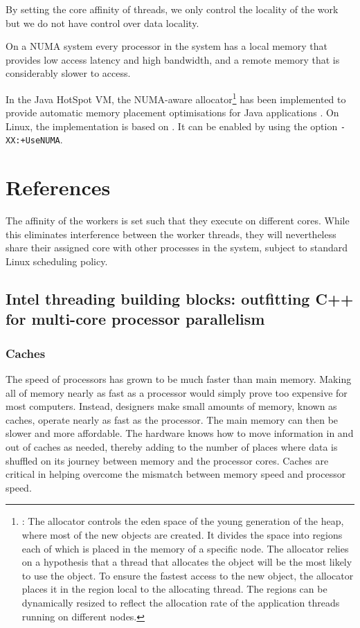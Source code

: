 By setting the core affinity of threads, we only control the locality
of the work but we do not have control over data locality.

On a NUMA system every processor in the system has a local memory that
provides low access latency and high bandwidth, and a remote memory
that is considerably slower to access.

In the Java HotSpot VM, the NUMA-aware
allocator\footnote{\cite{Oracle2010}: The allocator controls the eden
  space of the young generation of the heap, where most of the new
  objects are created. It divides the space into regions each of which
  is placed in the memory of a specific node. The allocator relies on
  a hypothesis that a thread that allocates the object will be the
  most likely to use the object. To ensure the fastest access to the
  new object, the allocator places it in the region local to the
  allocating thread. The regions can be dynamically resized to reflect
  the allocation rate of the application threads running on different
  nodes.} has been implemented to provide automatic memory placement
optimisations for Java applications \cite{Masamitsu2008, Oracle2010,
  Humble2010}. On Linux, the implementation is based on
\cite{Kleen2004}. It can be enabled by using the option
\verb!-XX:+UseNUMA!.


\section{References}

The affinity of the workers is set such that they execute on different
cores. While this eliminates interference between the worker threads,
they will nevertheless share their assigned core with other processes
in the system, subject to standard Linux scheduling policy.

\subsection*{Intel threading building blocks: outfitting C++ for
  multi-core processor parallelism \cite{Reinders2007}}

\subsubsection{Caches}

The speed of processors has grown to be much faster than main
memory. Making all of memory nearly as fast as a processor would
simply prove too expensive for most computers. Instead, designers make
small amounts of memory, known as caches, operate nearly as fast as
the processor. The main memory can then be slower and more
affordable. The hardware knows how to move information in and out of
caches as needed, thereby adding to the number of places where data is
shuffled on its journey between memory and the processor cores. Caches
are critical in helping overcome the mismatch between memory speed and
processor speed.

